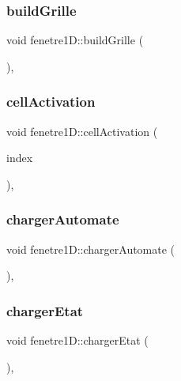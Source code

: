 \subsubsection{\texorpdfstring{build\+Grille}{buildGrille}}
{\footnotesize\ttfamily void fenetre1\+D\+::build\+Grille (\begin{DoxyParamCaption}{ }\end{DoxyParamCaption})\hspace{0.3cm}{\ttfamily [private]}, {\ttfamily [slot]}}

\mbox{\label{classfenetre1_d_a4ebfed6ec778e38de2039b077352d138}} 
\subsubsection{\texorpdfstring{cell\+Activation}{cellActivation}}
{\footnotesize\ttfamily void fenetre1\+D\+::cell\+Activation (\begin{DoxyParamCaption}\item[{const Q\+Model\+Index \&}]{index }\end{DoxyParamCaption})\hspace{0.3cm}{\ttfamily [private]}, {\ttfamily [slot]}}

\mbox{\label{classfenetre1_d_a812d2a814c96979138174c04137aa4fd}} 
\subsubsection{\texorpdfstring{charger\+Automate}{chargerAutomate}}
{\footnotesize\ttfamily void fenetre1\+D\+::charger\+Automate (\begin{DoxyParamCaption}{ }\end{DoxyParamCaption})\hspace{0.3cm}{\ttfamily [private]}, {\ttfamily [slot]}}

\mbox{\label{classfenetre1_d_a4e7c8a38df8987fd216c355a163d6c46}} 
\subsubsection{\texorpdfstring{charger\+Etat}{chargerEtat}}
{\footnotesize\ttfamily void fenetre1\+D\+::charger\+Etat (\begin{DoxyParamCaption}{ }\end{DoxyParamCaption})\hspace{0.3cm}{\ttfamily [private]}, {\ttfamily [slot]}}

